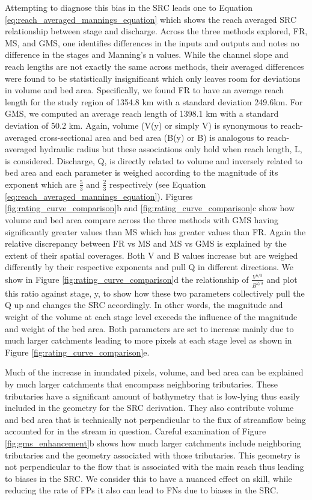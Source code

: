 Attempting to diagnose this bias in the SRC leads one to Equation \ref{eq:reach_averaged_mannings_equation} which shows the reach averaged SRC relationship between stage and discharge.
Across the three methods explored, FR, MS, and GMS, one identifies differences in the inputs and outputs and notes no difference in the stages and Manning's n values.
While the channel slope and reach lengths are not exactly the same across methods, their averaged differences were found to be statistically insignificant which only leaves room for deviations in volume and bed area.
Specifically, we found FR to have an average reach length for the study region of 1354.8 km with a standard deviation 249.6km.
For GMS, we computed an average reach length of 1398.1 km with a standard deviation of 50.2 km.
Again, volume (V(y) or simply V) is synonymous to reach-averaged cross-sectional area and bed area (B(y) or B) is analogous to reach-averaged hydraulic radius but these associations only hold when reach length, L, is considered.
Discharge, Q, is directly related to volume and inversely related to bed area and each parameter is weighed according to the magnitude of its exponent which are $\frac{5}{3}$ and $\frac{2}{3}$ respectively (see Equation \ref{eq:reach_averaged_mannings_equation}). 
Figures \ref{fig:rating_curve_comparison}b and \ref{fig:rating_curve_comparison}c show how volume and bed area compare across the three methods with GMS having significantly greater values than MS which has greater values than FR.
Again the relative discrepancy between FR vs MS and MS vs GMS is explained by the extent of their spatial coverages.
Both V and B values increase but are weighed differently by their respective exponents and pull Q in different directions.
We show in Figure \ref{fig:rating_curve_comparison}d the relationship of $\frac{V^{5/3}}{B^{2/3}}$ and plot this ratio against stage, y, to show how these two parameters collectively pull the Q up and changes the SRC accordingly.
In other words, the magnitude and weight of the volume at each stage level exceeds the influence of the magnitude and weight of the bed area.
Both parameters are set to increase mainly due to much larger catchments leading to more pixels at each stage level as shown in Figure \ref{fig:rating_curve_comparison}e.

Much of the increase in inundated pixels, volume, and bed area can be explained by much larger catchments that encompass neighboring tributaries.
These tributaries have a significant amount of bathymetry that is low-lying thus easily included in the geometry for the SRC derivation. 
They also contribute volume and bed area that is technically not perpendicular to the flux of streamflow being accounted for in the stream in question. 
Careful examination of Figure \ref{fig:gms_enhancement}b shows how much larger catchments include neighboring tributaries and the geometry associated with those tributaries. 
This geometry is not perpendicular to the flow that is associated with the main reach thus leading to biases in the SRC.
We consider this to have a nuanced effect on skill, while reducing the rate of FPs it also can lead to FNs due to biases in the SRC.

